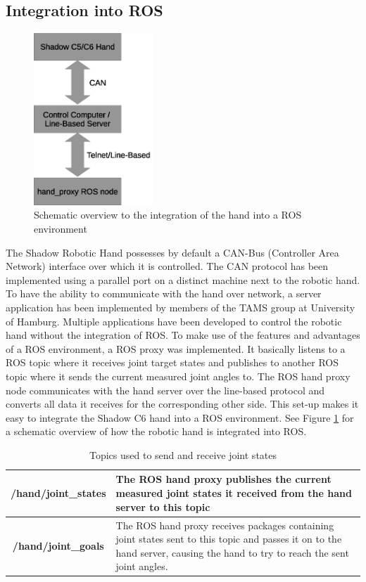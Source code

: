 \subsection{Integration into ROS}

\begin{figure}
	\vspace{-2.2em}
	\caption{\label{fig:hand:ros_integration}Schematic overview to the integration of the hand into a ROS environment}
	\includegraphics[width=0.4\textwidth]{assets/chpt_basics/hand/ros_integration.eps}
\end{figure}

The Shadow Robotic Hand possesses by default a CAN-Bus (Controller Area Network) interface over which it is controlled\cite{web:robothand:spec}. The CAN protocol has been implemented using a parallel port on a distinct machine next to the robotic hand. To have the ability to communicate with the hand over network, a server application has been implemented by members of the TAMS group at University of Hamburg. 
Multiple applications have been developed to control the robotic hand without the integration of ROS. To make use of the features and advantages of a ROS environment, a ROS proxy was implemented. It basically listens to a ROS topic where it receives joint target states and publishes to another ROS topic where it sends the current measured joint angles to. The ROS hand proxy node communicates with the hand server over the line-based protocol and converts all data it receives for the corresponding other side. This set-up makes it easy to integrate the Shadow C6 hand into a ROS environment. See Figure \ref{fig:hand:ros_integration} for a schematic overview of how the robotic hand is integrated into ROS.

\begin{table}
	\caption{\label{tab:rosmsg:topics}Topics used to send and receive joint states}
	\begin{tabularx}{\linewidth}{|c|X|}
		\hline
		\textbf{/hand/joint\_states} & The ROS hand proxy publishes the current measured joint states it received from the hand server to this topic \\
		\hline
		\textbf{/hand/joint\_goals} & The ROS hand proxy receives packages containing joint states sent to this topic and passes it on to the hand server, causing the hand to try to reach the sent joint angles. \\
		\hline
	\end{tabularx}
\end{table}

